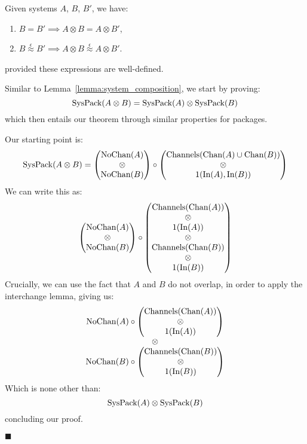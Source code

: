 \begin{lemma}
  Given systems $A$, $B$, $B'$, we have:
  \begin{enumerate}
    \item $B = B' \implies A \otimes B = A \otimes B'$,
    \item $B \overset{\epsilon}{\approx} B' \implies A \otimes B \overset{\epsilon}{\approx} A \otimes B'$.
  \end{enumerate}
  provided these expressions are well-defined.

   Similar to Lemma~\ref{lemma:system_composition},
  we start by proving:
  $$
  \text{SysPack}(A \otimes B) = \text{SysPack}(A) \otimes \text{SysPack}(B)
  $$
  which then entails our theorem through similar properties for packages.

  Our starting point is:
  $$
  \text{SysPack}(A \otimes B) =
  \begin{pmatrix}
    \text{NoChan}(A)\cr
    \otimes\cr
    \text{NoChan}(B)
  \end{pmatrix}
  \circ
  \begin{pmatrix}
    \text{Channels}(\text{Chan}(A) \cup \text{Chan}(B))\cr
    \otimes\cr
    1(\text{In}(A), \text{In}(B))
  \end{pmatrix}
  $$
  We can write this as:
  $$
  \begin{pmatrix}
    \text{NoChan}(A)\cr
    \otimes\cr
    \text{NoChan}(B)
  \end{pmatrix}
  \circ
  \begin{pmatrix}
    \text{Channels}(\text{Chan}(A))\cr
    \otimes\cr
    1(\text{In}(A))\cr
    \otimes\cr
    \text{Channels}(\text{Chan}(B))\cr
    \otimes\cr
    1(\text{In}(B))\cr
  \end{pmatrix}
  $$
  Crucially, we can use the fact that $A$ and $B$ do not overlap,
  in order to apply the interchange lemma, giving us:
  $$
  \begin{matrix}
    \text{NoChan}(A) \circ \begin{pmatrix}
    \text{Channels}(\text{Chan}(A))\cr
    \otimes\cr
    1(\text{In}(A))\cr
    \end{pmatrix}\cr
    \otimes\cr
    \text{NoChan}(B) \circ \begin{pmatrix}
    \text{Channels}(\text{Chan}(B))\cr
    \otimes\cr
    1(\text{In}(B))\cr
    \end{pmatrix}
  \end{matrix}
  $$
  Which is none other than:
  $$
  \text{SysPack}(A) \otimes \text{SysPack}(B)
  $$
  concluding our proof.

  $\blacksquare$
\end{lemma}
